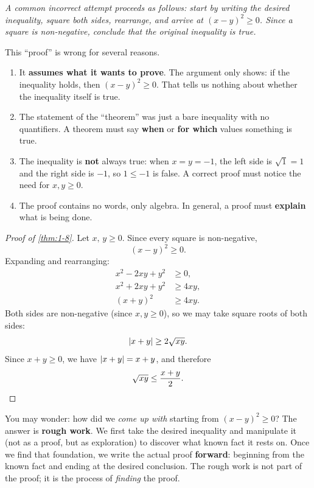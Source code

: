 \textit{A common incorrect attempt proceeds as follows: start by writing the desired inequality, square both sides, rearrange, and arrive at $(x - y)^{2} \ge 0$.  Since a square is non-negative, conclude that the original inequality is true.}

\begin{remark}[Warning]
This ``proof'' is wrong for several reasons.
\begin{enumerate}[label=(\arabic*)]
  \item It \textbf{assumes what it wants to prove}.  The argument only shows: if the inequality holds, then $(x - y)^{2} \ge 0$.  That tells us nothing about whether the inequality itself is true.
  \item The statement of the ``theorem'' was just a bare inequality with no quantifiers.  A theorem must say \textbf{when} or \textbf{for which} values something is true.
  \item The inequality is \textbf{not} always true: when $x = y = -1$, the left side is $\sqrt{1} = 1$ and the right side is $-1$, so $1 \le -1$ is false.  A correct proof must notice the need for $x, y \ge 0$.
  \item The proof contains no words, only algebra.  In general, a proof must \textbf{explain} what is being done.
\end{enumerate}
\end{remark}

\begin{proof}[Proof of \cref{thm:1-8}]
Let $x,\,y \ge 0$.  Since every square is non-negative,
\[
  (x - y)^{2} \ge 0.
\]
Expanding and rearranging:
\begin{align*}
  x^{2} - 2xy + y^{2} &\ge 0, \\
  x^{2} + 2xy + y^{2} &\ge 4xy, \\
  (x + y)^{2} &\ge 4xy.
\end{align*}
Both sides are non-negative (since $x, y \ge 0$), so we may take square roots of both sides:
\[
  \left\lvert x + y \right\rvert \ge 2\sqrt{xy}.
\]
Since $x + y \ge 0$, we have $\left\lvert x + y \right\rvert = x + y$, and therefore
\[
  \sqrt{xy} \le \frac{x + y}{2}.  \qedhere
\]
\end{proof}

\begin{remark}
You may wonder: how did we \textit{come up with} starting from $(x - y)^{2} \ge 0$?  The answer is \textbf{rough work}.  We first take the desired inequality and manipulate it (not as a proof, but as exploration) to discover what known fact it rests on.  Once we find that foundation, we write the actual proof \textbf{forward}: beginning from the known fact and ending at the desired conclusion.  The rough work is not part of the proof; it is the process of \textit{finding} the proof.
\end{remark}

